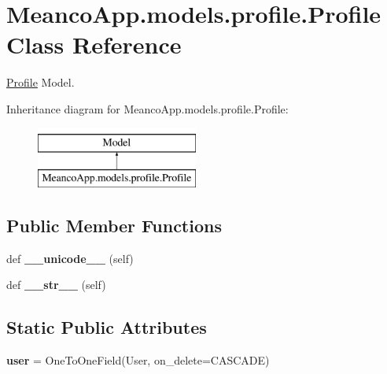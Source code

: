 \hypertarget{class_meanco_app_1_1models_1_1profile_1_1_profile}{}\section{Meanco\+App.\+models.\+profile.\+Profile Class Reference}
\label{class_meanco_app_1_1models_1_1profile_1_1_profile}


\hyperlink{class_meanco_app_1_1models_1_1profile_1_1_profile}{Profile} Model.  


Inheritance diagram for Meanco\+App.\+models.\+profile.\+Profile\+:\begin{figure}[H]
\begin{center}
\leavevmode
\includegraphics[height=2.000000cm]{class_meanco_app_1_1models_1_1profile_1_1_profile}
\end{center}
\end{figure}
\subsection*{Public Member Functions}
\begin{DoxyCompactItemize}
\item 
\hypertarget{class_meanco_app_1_1models_1_1profile_1_1_profile_a12abe23972a6b037dfb28b717b2f6328}{}\label{class_meanco_app_1_1models_1_1profile_1_1_profile_a12abe23972a6b037dfb28b717b2f6328} 
def {\bfseries \+\_\+\+\_\+unicode\+\_\+\+\_\+} (self)
\item 
\hypertarget{class_meanco_app_1_1models_1_1profile_1_1_profile_abdf85920a6ced0713ff0de52841f88c2}{}\label{class_meanco_app_1_1models_1_1profile_1_1_profile_abdf85920a6ced0713ff0de52841f88c2} 
def {\bfseries \+\_\+\+\_\+str\+\_\+\+\_\+} (self)
\end{DoxyCompactItemize}
\subsection*{Static Public Attributes}
\begin{DoxyCompactItemize}
\item 
\hypertarget{class_meanco_app_1_1models_1_1profile_1_1_profile_acdfc5f0bf52cb11bc498e1622c8c720a}{}\label{class_meanco_app_1_1models_1_1profile_1_1_profile_acdfc5f0bf52cb11bc498e1622c8c720a} 
{\bfseries user} = One\+To\+One\+Field(User, on\+\_\+delete=C\+A\+S\+C\+A\+DE)
\end{DoxyCompactItemize}


